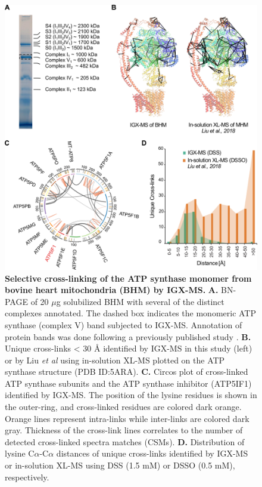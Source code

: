 \begin{figure}[p]
	\center
	\includegraphics[]{Chapter.2/Figures/Figure4.png}
	\caption{\textbf{Selective cross-linking of the ATP synthase monomer from bovine heart mitochondria (BHM) by IGX-MS.} \textbf{A.} BN-PAGE of 20 $\mu$g solubilized BHM with several of the distinct complexes annotated. The dashed box indicates the monomeric ATP synthase (complex V) band subjected to IGX-MS. Annotation of protein bands was done following a previously published study \cite{Wittig_2010}. \textbf{B.} Unique cross-links < 30 Å identified by IGX-MS in this study (left) or by Liu \emph{et al} \cite{Liu_2018} using in-solution XL-MS plotted on the ATP synthase structure (PDB ID:5ARA). \textbf{C.} Circos plot of cross-linked ATP synthase subunits and the ATP synthase inhibitor (ATP5IF1) identified by IGX-MS. The position of the lysine residues is shown in the outer-ring, and cross-linked residues are colored dark orange. Orange lines represent intra-links while inter-links are colored dark gray. Thickness of the cross-link lines correlates to the number of detected cross-linked spectra matches (CSMs). \textbf{D.} Distribution of lysine C$\alpha$-C$\alpha$ distances of unique cross-links identified by IGX-MS or in-solution XL-MS \cite{Liu_2018} using DSS (1.5 mM) or DSSO (0.5 mM), respectively.}
	\label{fig:ch2_fig4}
\end{figure}
